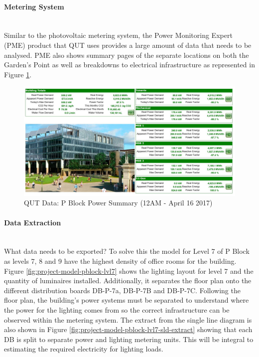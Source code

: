 \newpage

\paragraph{Metering System}
~~\\
Similar to the photovoltaic metering system, the Power Monitoring Expert (PME) product that QUT uses provides a large amount of data that needs to be analysed. PME also shows summary pages of the separate locations on both the Garden's Point as well as breakdowns to electrical infrastructure as represented in Figure \ref{fig:qut-pme-pblock-summary}. 

\begin{figure}[H]
	\hfill\includegraphics[width = 150mm]{images/metering/pme/pme-p-block-summary-page}\hspace*{\fill}
	\caption{QUT Data: P Block Power Summary (12AM - April 16 2017)} 
	\label{fig:qut-pme-pblock-summary}
\end{figure} 

\paragraph{Data Extraction}
~~\\
What data needs to be exported? To solve this the model for Level 7 of P Block as levels 7, 8 and 9 have the highest density of office rooms for the building. Figure \ref{fig:project-model-pblock-lvl7} shows the lighting layout for level 7 and the quantity of luminaires installed. Additionally, it separates the floor plan onto the different distribution boards DB-P-7a, DB-P-7B and DB-P-7C. Following the floor plan, the building's power systems must be separated to understand where the power for the lighting comes from so the correct infrastructure can be observed within the metering system. The extract from the single line diagram is also shown in Figure \ref{fig:project-model-pblock-lvl7-sld-extract} showing that each DB is split to separate power and lighting metering units. This will be integral to estimating the required electricity for lighting loads.      

